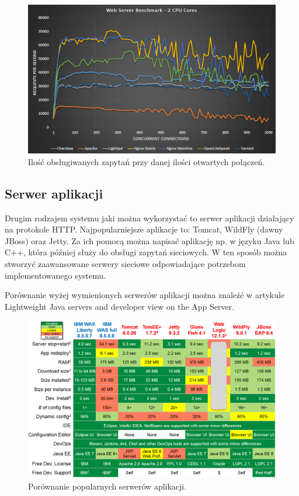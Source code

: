 \documentclass[eng]{mgr}
\begin{document}
			\begin{center}
				\begin{figure}[ht]
					\centering
					\includegraphics[scale=0.35]{web-server-performance-benchmark-2-cpu-cores-2.jpg}
					\caption{Ilość obsługiwanych zapytań przy danej ilości otwartych połączeń. \cite{webserverbenchmark}}
				\end{figure}
			\end{center}
		
			\subsection{Serwer aplikacji}
			Drugim rodzajem systemu jaki można wykorzystać to serwer aplikacji działający na protokole HTTP. Najpopularniejsze aplikacje \cite{mostpopularjavaservers} to: Tomcat, WildFly (dawny JBoss) oraz Jetty. Za ich pomocą można napisać aplikację np. w języku Java lub C++, która później służy do obsługi zapytań sieciowych. W ten sposób można stworzyć zaawansowane serwery sieciowe odpowiadające potrzebom implementowanego systemu.
		
			Porównanie wyżej wymienionych serwerów aplikacji można znaleźć w artykule Lightweight Java servers and developer view on the App Server.
		
			\begin{center}
				\begin{figure}[ht]
					\centering
					\includegraphics[scale=0.55]{weblogic-jboss-wildfly-websphere-liberty-tomee-tomcat-glassfish-comparison1.png}
					\caption{Porównanie popularnych serwerów aplikacji. \cite{javaserverscomparison}}
				\end{figure}
			\end{center}
		
\end{document}
